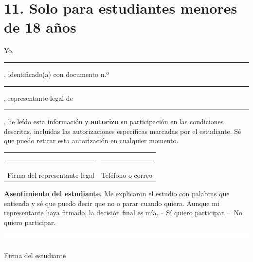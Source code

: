 \documentclass[11pt,letterpaper]{article}
\newcommand{\linea}[1][6cm]{\rule{#1}{0.4pt}}
\newcommand{\casilla}{$\square$\ }
\begin{document}
\section*{11. Solo para estudiantes menores de 18 años}

\medskip
\noindent Yo, \linea[7cm], identificado(a) con documento n.º \linea[3.5cm], representante legal de \linea[6.5cm], he leído esta información y \textbf{autorizo} su participación en las condiciones descritas, incluidas las autorizaciones específicas marcadas por el estudiante. Sé que puedo retirar esta autorización en cualquier momento.

\vspace{0.8cm}
\noindent
\begin{tabularx}{\linewidth}{@{}XX@{}}
\linea[7cm] & \linea[7cm]\\
Firma del representante legal & Teléfono o correo\\
\end{tabularx}

\medskip
\noindent\textbf{Asentimiento del estudiante.} Me explicaron el estudio con palabras que entiendo y sé que puedo decir que no o parar cuando quiera. Aunque mi representante haya firmado, la decisión final es mía. \quad \casilla Sí quiero participar. \quad \casilla No quiero participar.

\vspace{0.7cm}
\noindent\linea[7cm]\\
Firma del estudiante
\end{document}
